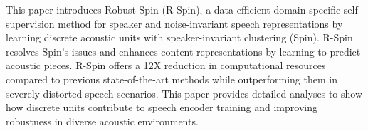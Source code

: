 This paper introduces Robust Spin (R-Spin), a data-efficient domain-specific self-supervision method for speaker and noise-invariant speech representations by learning discrete acoustic units with speaker-invariant clustering (Spin). R-Spin resolves Spin's issues and enhances content representations by learning to predict acoustic pieces. R-Spin offers a 12X reduction in computational resources compared to previous state-of-the-art methods while outperforming them in severely distorted speech scenarios. This paper provides detailed analyses to show how discrete units contribute to speech encoder training and improving robustness in diverse acoustic environments.